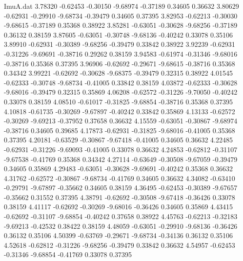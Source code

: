 \begin{filecontents}{ImuA.dat}
   3.78320   -0.62453   -0.30150   -9.68974   -0.37189    0.34605    0.36632
   3.80629   -0.62931   -0.29910   -9.68734   -0.39479    0.34605    0.37395
   3.82953   -0.62213   -0.30030   -9.68615   -0.37189    0.35368    0.38922
   3.85281   -0.63051   -0.30628   -9.68256   -0.37189    0.36132    0.38159
   3.87605   -0.63051   -0.30748   -9.68136   -0.40242    0.33078    0.35106
   3.89910   -0.62931   -0.30389   -9.68256   -0.39479    0.33842    0.38922
   3.92239   -0.62931   -0.31226   -9.69691   -0.38716    0.29262    0.38159
   3.94583   -0.61974   -0.31346   -9.68016   -0.38716    0.35368    0.37395
   3.96906   -0.62692   -0.29671   -9.68615   -0.38716    0.35368    0.34342
   3.99221   -0.62692   -0.30628   -9.68375   -0.39479    0.32315    0.38922
   4.01545   -0.62333   -0.30748   -9.68734   -0.41005    0.33842    0.38159
   4.03872   -0.62333   -0.30628   -9.68016   -0.39479    0.32315    0.35869
   4.06208   -0.62572   -0.31226   -9.70050   -0.40242    0.33078    0.38159
   4.08510   -0.61017   -0.31825   -9.68854   -0.38716    0.35368    0.37395
   4.10818   -0.61735   -0.30269   -9.67897   -0.40242    0.33842    0.35869
   4.13133   -0.62572   -0.30269   -9.69213   -0.37952    0.37658    0.36632
   4.15559   -0.63051   -0.30867   -9.68974   -0.38716    0.34605    0.39685
   4.17873   -0.62931   -0.31825   -9.68016   -0.41005    0.35368    0.37395
   4.20181   -0.63529   -0.30867   -9.67418   -0.41005    0.34605    0.36632
   4.22485   -0.62931   -0.31226   -9.69093   -0.41005    0.33078    0.36632
   4.24853   -0.62812   -0.31107   -9.67538   -0.41769    0.35368    0.34342
   4.27114   -0.63649   -0.30508   -9.67059   -0.39479    0.34605    0.35869
   4.29483   -0.63051   -0.30628   -9.69691   -0.40242    0.35368    0.36632
   4.31762   -0.62572   -0.30867   -9.68734   -0.41769    0.34605    0.36632
   4.34082   -0.63410   -0.29791   -9.67897   -0.35662    0.34605    0.38159
   4.36495   -0.62453   -0.30389   -9.67657   -0.35662    0.31552    0.37395
   4.38791   -0.62692   -0.30508   -9.67418   -0.36426    0.33078    0.38159
   4.41117   -0.62692   -0.30269   -9.68016   -0.36426    0.34605    0.35869
   4.43415   -0.62692   -0.31107   -9.68854   -0.40242    0.37658    0.38922
   4.45763   -0.62213   -0.32183   -9.69213   -0.42532    0.38422    0.38159
   4.48059   -0.63051   -0.29910   -9.68136   -0.36426    0.36132    0.35106
   4.50399   -0.63769   -0.29671   -9.68734   -0.34136    0.36132    0.35106
   4.52618   -0.62812   -0.31226   -9.68256   -0.39479    0.33842    0.36632
   4.54957   -0.62453   -0.31346   -9.68854   -0.41769    0.33078    0.37395

\end{filecontents}
